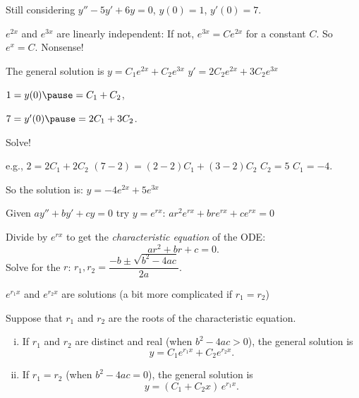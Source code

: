 \documentclass[10pt,aspectratio=169]{beamer}
\begin{document}
\begin{frame}
Still considering
\qquad $y''-5y'+6y = 0$, \qquad $y(0) = 1$, \qquad $y'(0) = 7$.

\medskip

$e^{2x}$ and $e^{3x}$ are linearly independent:
\pause
If not, $e^{3x} = C e^{2x}$ for a constant $C$.
\pause
So $e^x = C$.
\pause
Nonsense!

\medskip
\pause

The general solution is \quad $y = C_1 e^{2x} + C_2 e^{3x}$
\pause
\qquad
$y' = 2 C_2 e^{2x} + 3 C_2 e^{3x}$

\medskip
\pause

$1 = y(0) \pause = C_1 + C_2$,

\medskip
\pause

$7 = y'(0) \pause = 2 C_1 + 3 C_2$.

\medskip
\pause

Solve!

\pause
e.g., $2 = 2C_1 + 2C_2$
\pause\wthus
$(7-2) = (2-2)C_1 + (3-2)C_2$
\pause
\wthus
$C_2 = 5$
\pause
\wthus
$C_1 = -4$.

\medskip
\pause

So the solution is: \quad
$y = -4 e^{2x} + 5 e^{3x}$

\end{frame}

\begin{frame}
Given
\quad
$a y'' + b y' + c y = 0$
\qquad
\pause
try $y = e^{rx}$:
\quad
$a r^2 e^{rx} + 
b r e^{rx} + 
c e^{rx} = 0$

\medskip
\pause
Divide by $e^{rx}$ to get the
\emph{characteristic equation} of the ODE:
\[
a r^2 + 
b r + 
c = 0 .
\]
\pause
Solve for the $r$:
\qquad 
$r_1, r_2 = \dfrac{-b \pm \sqrt{b^2 - 4ac}}{2a}$.

\medskip
\pause

\wthus $e^{r_1 x}$ and $e^{r_2 x}$ are solutions (a bit more complicated if
$r_1=r_2$)

\pause
\begin{theorem}
Suppose that $r_1$ and $r_2$ are the roots of the characteristic equation.
\begin{enumerate}[(i)]
\item\pause
If $r_1$ and $r_2$ are distinct and real (when $b^2 - 4ac > 0$),
the general solution is
\[
y = C_1 e^{r_1 x} + C_2 e^{r_2 x} .
\]
\item
\pause
If $r_1 = r_2$ (when $b^2 - 4ac = 0$), 
the general solution is
\[
y = (C_1 + C_2 x)\, e^{r_1 x} .
\]
\end{enumerate}
\end{theorem}
\end{frame}
\end{document}
